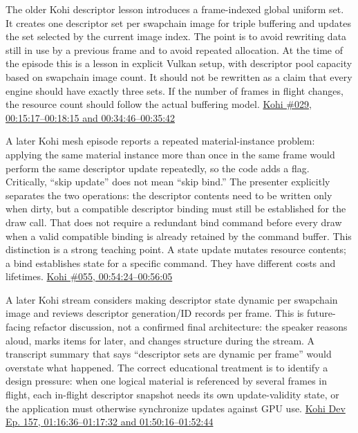 The older Kohi descriptor lesson introduces a frame-indexed global uniform set. It creates one descriptor set per swapchain image for triple buffering and updates the set selected by the current image index. The point is to avoid rewriting data still in use by a previous frame and to avoid repeated allocation. At the time of the episode this is a lesson in explicit Vulkan setup, with descriptor pool capacity based on swapchain image count. It should not be rewritten as a claim that every engine should have exactly three sets. If the number of frames in flight changes, the resource count should follow the actual buffering model. \href{https://www.youtube.com/watch?v=yc40ixalLtU&t=15m17s}{Kohi \#029, 00:15:17--00:18:15 and 00:34:46--00:35:42}

A later Kohi mesh episode reports a repeated material-instance problem: applying the same material instance more than once in the same frame would perform the same descriptor update repeatedly, so the code adds a  flag. Critically, ``skip update'' does not mean ``skip bind.'' The presenter explicitly separates the two operations: the descriptor contents need to be written only when dirty, but a compatible descriptor binding must still be established for the draw call. That does not require a redundant bind command before every draw when a valid compatible binding is already retained by the command buffer. This distinction is a strong teaching point. A state update mutates resource contents; a bind establishes state for a specific command. They have different costs and lifetimes. \href{https://www.youtube.com/watch?v=kIbW4Kv6p4c&t=54m24s}{Kohi \#055, 00:54:24--00:56:05}

A later Kohi stream considers making descriptor state dynamic per swapchain image and reviews descriptor generation/ID records per frame. This is future-facing refactor discussion, not a confirmed final architecture: the speaker reasons aloud, marks items for later, and changes structure during the stream. A transcript summary that says ``descriptor sets are dynamic per frame'' would overstate what happened. The correct educational treatment is to identify a design pressure: when one logical material is referenced by several frames in flight, each in-flight descriptor snapshot needs its own update-validity state, or the application must otherwise synchronize updates against GPU use. \href{https://www.youtube.com/watch?v=ZmZUmsqUN6Q&t=1h16m36s}{Kohi Dev Ep. 157, 01:16:36--01:17:32 and 01:50:16--01:52:44}


